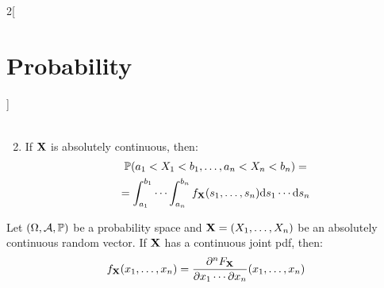 \documentclass[../../../main.tex]{subfiles}
\begin{document}
\begin{multicols}{2}[\section{Probability}]
\begin{prop}
\begin{enumerate}
\begin{multline*}
            \end{multline*}
      \item If $\boldsymbol{\mathrm{X}}$ is absolutely continuous, then:
            \begin{multline*}
              \mathbb{P}(a_1<X_1<b_1,\ldots,a_n<X_n<b_n)=\\=\int_{a_1}^{b_1}\cdots\int_{a_n}^{b_n} f_{\boldsymbol{\mathrm{X}}}(s_1,\ldots,s_n)\dd s_1\cdots\dd s_n
            \end{multline*}
    \end{enumerate}
  \end{prop}
  \begin{prop}
    Let $(\Omega,\mathcal{A},\mathbb{P})$ be a probability space and $\boldsymbol{\mathrm{X}}=(X_1,\ldots,X_n)$ be an absolutely continuous random vector. If $\boldsymbol{\mathrm{X}}$ has a continuous joint pdf, then: $$f_{\boldsymbol{\mathrm{X}}}(x_1,\ldots,x_n)=\frac{\partial^nF_{\boldsymbol{\mathrm{X}}}}{\partial x_1\cdots\partial x_n}(x_1,\ldots,x_n)$$
  \end{prop}

\end{multicols}
\end{document}
